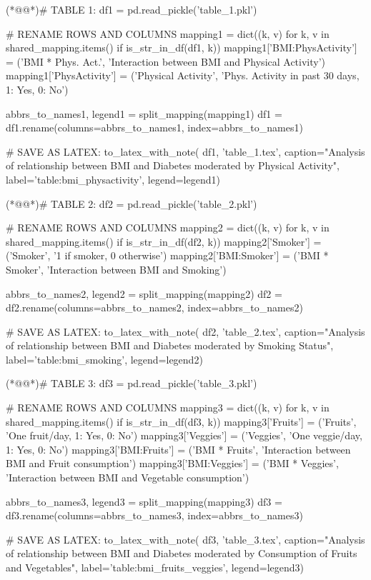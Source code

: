 \documentclass[11pt]{article}
\begin{document}
\begin{python}
(*@@*)# TABLE 1:
df1 = pd.read_pickle('table_1.pkl')

# RENAME ROWS AND COLUMNS
mapping1 = dict((k, v) for k, v in shared_mapping.items() if is_str_in_df(df1, k))
mapping1['BMI:PhysActivity'] = ('BMI * Phys. Act.', 'Interaction between BMI and Physical Activity')
mapping1['PhysActivity'] = ('Physical Activity', 'Phys. Activity in past 30 days, 1: Yes, 0: No')

abbrs_to_names1, legend1 = split_mapping(mapping1)
df1 = df1.rename(columns=abbrs_to_names1, index=abbrs_to_names1)

# SAVE AS LATEX:
to_latex_with_note(
    df1, 'table_1.tex',
    caption="Analysis of relationship between BMI and Diabetes moderated by Physical Activity", 
    label='table:bmi_physactivity',
    legend=legend1)

(*@@*)# TABLE 2:
df2 = pd.read_pickle('table_2.pkl')

# RENAME ROWS AND COLUMNS
mapping2 = dict((k, v) for k, v in shared_mapping.items() if is_str_in_df(df2, k))
mapping2['Smoker'] = ('Smoker', '1 if smoker, 0 otherwise')
mapping2['BMI:Smoker'] = ('BMI * Smoker', 'Interaction between BMI and Smoking')

abbrs_to_names2, legend2 = split_mapping(mapping2)
df2 = df2.rename(columns=abbrs_to_names2, index=abbrs_to_names2)

# SAVE AS LATEX:
to_latex_with_note(
    df2, 'table_2.tex',
    caption="Analysis of relationship between BMI and Diabetes moderated by Smoking Status", 
    label='table:bmi_smoking',
    legend=legend2)


(*@@*)# TABLE 3:
df3 = pd.read_pickle('table_3.pkl')

# RENAME ROWS AND COLUMNS
mapping3 = dict((k, v) for k, v in shared_mapping.items() if is_str_in_df(df3, k))
mapping3['Fruits'] = ('Fruits', 'One fruit/day, 1: Yes, 0: No')
mapping3['Veggies'] = ('Veggies', 'One veggie/day, 1: Yes, 0: No')
mapping3['BMI:Fruits'] = ('BMI * Fruits', 'Interaction between BMI and Fruit consumption')
mapping3['BMI:Veggies'] = ('BMI * Veggies', 'Interaction between BMI and Vegetable consumption')

abbrs_to_names3, legend3 = split_mapping(mapping3)
df3 = df3.rename(columns=abbrs_to_names3, index=abbrs_to_names3)

# SAVE AS LATEX:
to_latex_with_note(
    df3, 'table_3.tex',
    caption="Analysis of relationship between BMI and Diabetes moderated by Consumption of Fruits and Vegetables", 
    label='table:bmi_fruits_veggies',
    legend=legend3)
    

\end{python}
\end{document}
